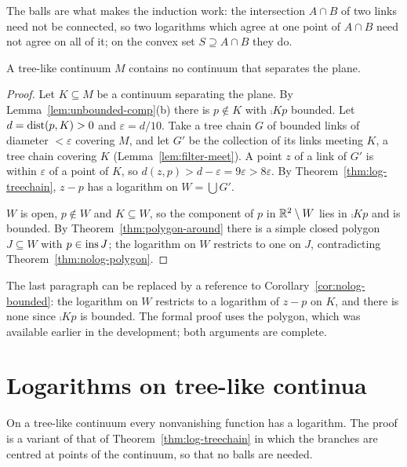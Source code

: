 
The balls are what makes the induction work: the intersection $A\cap B$ of two links need not be
connected, so two logarithms which agree at one point of $A\cap B$ need not agree on all of it; on
the convex set $S\supseteq A\cap B$ they do.

\begin{theorem}\label{thm:treelike-nonsep}
A tree-like continuum $M$ contains no continuum that separates the plane.
\end{theorem}

\begin{proof}
Let $K\subseteq M$ be a continuum separating the plane. By Lemma~\ref{lem:unbounded-comp}(b) there is
$p\notin K$ with $\comp Kp$ bounded. Let $d=\operatorname{dist}(p,K)>0$ and $\varepsilon=d/10$. Take a tree chain $G$
of bounded links of diameter $<\varepsilon$ covering $M$, and let $G'$ be the collection of its links
meeting $K$, a tree chain covering $K$ (Lemma~\ref{lem:filter-meet}). A point $z$ of a link of $G'$
is within $\varepsilon$ of a point of $K$, so $d(z,p)>d-\varepsilon=9\varepsilon>8\varepsilon$. By
Theorem~\ref{thm:log-treechain}, $z-p$ has a logarithm on $W=\bigcup G'$.

$W$ is open, $p\notin W$ and $K\subseteq W$, so the component of $p$ in $\mathbb{R}^2\setminus W$ lies in
$\comp Kp$ and is bounded. By Theorem~\ref{thm:polygon-around} there is a simple closed polygon
$J\subseteq W$ with $p\in\operatorname{ins} J$; the logarithm on $W$ restricts to one on $J$, contradicting
Theorem~\ref{thm:nolog-polygon}.
\end{proof}


\begin{remark}
The last paragraph can be replaced by a reference to Corollary~\ref{cor:nolog-bounded}: the
logarithm on $W$ restricts to a logarithm of $z-p$ on $K$, and there is none since $\comp Kp$ is
bounded. The formal proof uses the polygon, which was available earlier in the development; both
arguments are complete.
\end{remark}

\section{Logarithms on tree-like continua}

On a tree-like continuum every nonvanishing function has a logarithm. The proof is a variant of
that of Theorem~\ref{thm:log-treechain} in which the branches are centred at points of the continuum,
so that no balls are needed.

